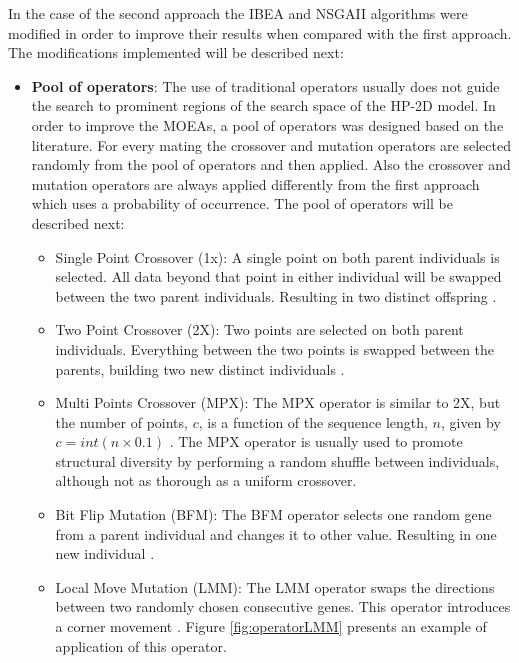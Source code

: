 In the case of the second approach the IBEA and NSGAII algorithms were modified in order to improve their results when compared with the first approach. The modifications implemented will be described next:

\begin{itemize}
	
	\item \textbf{Pool of operators}: The use of traditional operators usually does not guide the search to prominent regions of the search space of the HP-2D model. In order to improve the MOEAs, a pool of operators was designed based on the literature. For every mating the crossover and mutation operators are selected randomly from the pool of operators and then applied. Also the crossover and mutation operators are always applied differently from the first approach which uses a probability of occurrence. The pool of operators will be described next:
	
	\begin{itemize}
		\item Single Point Crossover (1x): A single point on both parent individuals is selected. All data beyond that point in either individual will be swapped between the two parent individuals. Resulting in two distinct offspring \cite{holland1975adaptation}.
		
		\item Two Point Crossover (2X): Two points are selected on both parent individuals. Everything between the two points is swapped between the parents, building two new distinct individuals \cite{holland1975adaptation}.
		
		\item Multi Points Crossover (MPX): The MPX operator is similar to 2X, but the number of points, $c$, is a function of the sequence length, $n$, given by $c = int(n \times 0.1)$ \cite{custodio2004investigation}. The MPX operator is usually used to promote structural diversity by performing a random shuffle between individuals, although not as thorough as a uniform crossover.
		
		\item Bit Flip Mutation (BFM): The BFM operator selects one random gene from a parent individual and changes it to other value. Resulting in one new individual \cite{holland1975adaptation}.
		
		\item Local Move Mutation (LMM): The LMM operator swaps the directions between two randomly chosen consecutive genes. This operator introduces a corner movement \cite{bazzoli2004memetic}. Figure \ref{fig:operatorLMM} presents an example of application of this operator.
		

\end{itemize}
\end{itemize}
